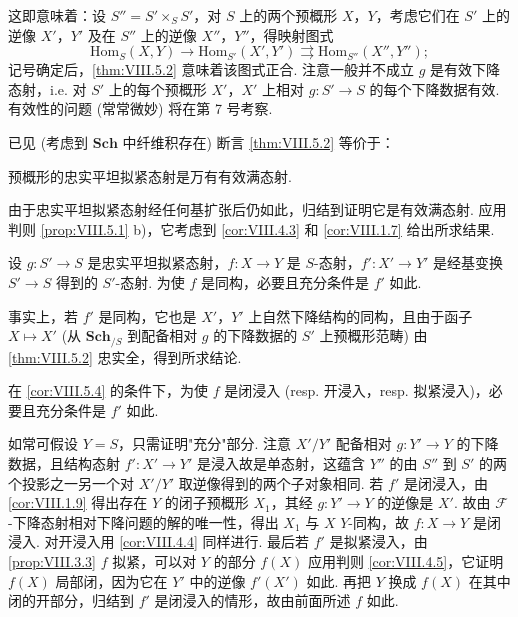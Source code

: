 这即意味着：设 $S'' = S' \times_S S'$，对 $S$ 上的两个预概形 $X$，$Y$，考虑它们在 $S'$ 上的逆像 $X'$，$Y'$ 及在 $S''$ 上的逆像 $X''$，$Y''$，得映射图式
\[
\mathrm{Hom}_S(X, Y) \longrightarrow \mathrm{Hom}_{S'}(X', Y') \rightrightarrows \mathrm{Hom}_{S''}(X'', Y'');
\]
记号确定后，\ref{thm:VIII.5.2} 意味着该图式正合. 注意一般并不成立 $g$ 是有效下降态射，i.e. 对 $S'$ 上的每个预概形 $X'$，$X'$ 上相对 $g \colon S' \to S$ 的每个下降数据有效. 有效性的问题 (常常微妙) 将在第 7 号考察.

已见 \cite{exp08-D} (考虑到 $\mathbf{Sch}$ 中纤维积存在) 断言 \ref{thm:VIII.5.2} 等价于：

\begin{corollary}\label{cor:VIII.5.3}
预概形的忠实平坦拟紧态射是万有有效满态射.
\end{corollary}

由于忠实平坦拟紧态射经任何基扩张后仍如此，归结到证明它是有效满态射. 应用判则 \ref{prop:VIII.5.1} b)，它考虑到 \ref{cor:VIII.4.3} 和 \ref{cor:VIII.1.7} 给出所求结果.

\begin{corollary}\label{cor:VIII.5.4}
设 $g \colon S' \to S$ 是忠实平坦拟紧态射，$f \colon X \to Y$ 是 $S$-态射，$f' \colon X' \to Y'$ 是经基变换 $S' \to S$ 得到的 $S'$-态射. 为使 $f$ 是同构，必要且充分条件是 $f'$ 如此.
\end{corollary}

事实上，若 $f'$ 是同构，它也是 $X'$，$Y'$ 上自然下降结构的同构，且由于函子 $X \mapsto X'$ (从 $\mathbf{Sch}_{/S}$ 到配备相对 $g$ 的下降数据的 $S'$ 上预概形范畴) 由 \ref{thm:VIII.5.2} 忠实全，得到所求结论.

\begin{corollary}\label{cor:VIII.5.5}
在 \ref{cor:VIII.5.4} 的条件下，为使 $f$ 是闭浸入 (resp. 开浸入，resp. 拟紧浸入)，必要且充分条件是 $f'$ 如此.
\end{corollary}

如常可假设 $Y = S$，只需证明"充分"部分. 注意 $X'/Y'$ 配备相对 $g \colon Y' \to Y$ 的下降数据，且结构态射 $f' \colon X' \to Y'$ 是浸入故是单态射，这蕴含 $Y''$ 的由 $S''$ 到 $S'$ 的两个投影之一另一个对 $X'/Y'$ 取逆像得到的两个子对象相同. 若 $f'$ 是闭浸入，由 \ref{cor:VIII.1.9} 得出存在 $Y$ 的闭子预概形 $X_1$，其经 $g \colon Y' \to Y$ 的逆像是 $X'$. 故由 $\mathcal{F}$-下降态射相对下降问题的解的唯一性，得出 $X_1$ 与 $X$ $Y$-同构，故 $f \colon X \to Y$ 是闭浸入. 对开浸入用 \ref{cor:VIII.4.4} 同样进行. 最后若 $f'$ 是拟紧浸入，由 \ref{prop:VIII.3.3} $f$ 拟紧，可以对 $Y$ 的部分 $f(X)$ 应用判则 \ref{cor:VIII.4.5}，它证明 $f(X)$ 局部闭，因为它在 $Y'$ 中的逆像 $f'(X')$ 如此. 再把 $Y$ 换成 $f(X)$ 在其中闭的开部分，归结到 $f'$ 是闭浸入的情形，故由前面所述 $f$ 如此.

